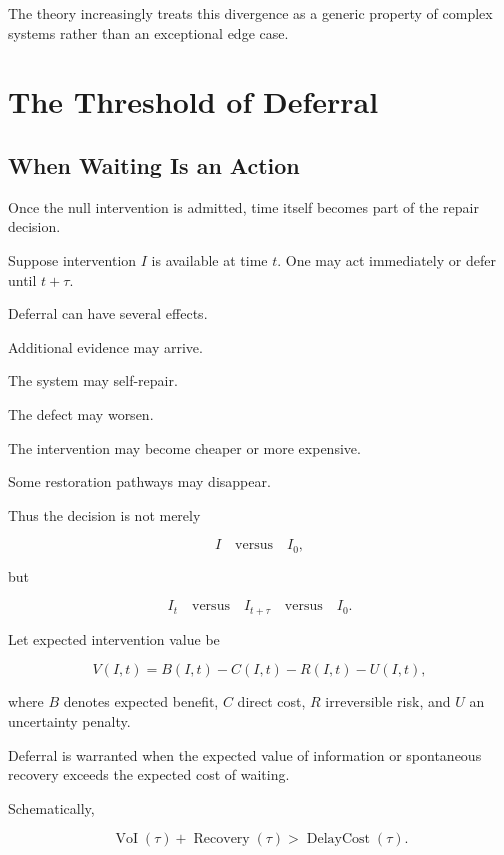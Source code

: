 \documentclass[11pt]{article}
\theoremstyle{remark}
\begin{document}
The theory increasingly treats this divergence as a generic property of complex systems rather than an exceptional edge case.

\section{The Threshold of Deferral}

\subsection{When Waiting Is an Action}

Once the null intervention is admitted, time itself becomes part of the repair decision.

Suppose intervention $I$ is available at time $t$. One may act immediately or defer until $t+\tau$.

Deferral can have several effects.

Additional evidence may arrive.

The system may self-repair.

The defect may worsen.

The intervention may become cheaper or more expensive.

Some restoration pathways may disappear.

Thus the decision is not merely

\begin{equation}
I
\quad\text{versus}\quad
I_0,
\end{equation}

but

\begin{equation}
I_t
\quad\text{versus}\quad
I_{t+\tau}
\quad\text{versus}\quad
I_0.
\end{equation}

Let expected intervention value be

\begin{equation}
V(I,t)
=
B(I,t)
-
C(I,t)
-
R(I,t)
-
U(I,t),
\end{equation}

where $B$ denotes expected benefit, $C$ direct cost, $R$ irreversible risk, and $U$ an uncertainty penalty.

Deferral is warranted when the expected value of information or spontaneous recovery exceeds the expected cost of waiting.

Schematically,

\begin{equation}
\operatorname{VoI}(\tau)
+
\operatorname{Recovery}(\tau)
>
\operatorname{DelayCost}(\tau).
\end{equation}
\end{document}
